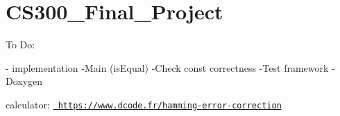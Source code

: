 \chapter{CS300\+\_\+\+Final\+\_\+\+Project}
\hypertarget{md_README}{}\label{md_README}
\label{md_README_autotoc_md0}%
%


To Do\+:

-\/ implementation -\/Main (is\+Equal) -\/Check const correctness -\/Test framework -\/Doxygen

 calculator\+: \href{https://www.dcode.fr/hamming-error-correction}{\texttt{ https\+://www.\+dcode.\+fr/hamming-\/error-\/correction}} 